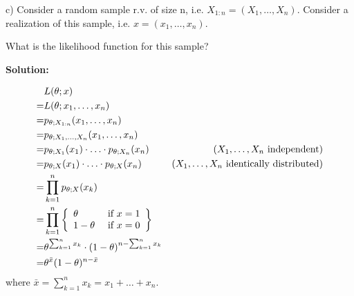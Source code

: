 \documentclass{article}
\begin{document}
c)
Consider a random sample r.v. of size n, i.e. \(X_{1:n}=(X_1, \ldots, X_n)\).
Consider a realization of this sample, i.e. \(x=(x_1, \ldots, x_n)\).

What is the likelihood function for this sample?

\textbf{Solution:}

\begin{align*}
     & L(\theta;x) \\
    =& L(\theta;x_1,\ldots,x_n) \\
    =& p_{\theta;X_{1:n}}(x_1,\ldots,x_n) \\
    =& p_{\theta;X_1,\ldots,X_n}(x_1,\ldots,x_n) \\
    =& p_{\theta;X_1}(x_1)\cdot \ldots \cdot p_{\theta;X_n}(x_n) & (X_1,\ldots,X_n\text{ independent}) \\
    =& p_{\theta;X}(x_1)\cdot \ldots \cdot p_{\theta;X}(x_n) & (X_1,\ldots,X_n\text{ identically distributed}) \\
    =& \prod_{k=1}^n p_{\theta;X}(x_k) \\
    =& \prod_{k=1}^n \left\{\begin{array}{lr}\theta & \text{ if }x=1\\1-\theta & \text{ if }x=0\end{array}\right\} \\
    =& \theta^{\sum_{k=1}^n x_k}\cdot (1-\theta)^{n-\sum_{k=1}^n x_k} \\
    =& \theta^{\bar{x}} (1-\theta)^{n-\bar{x}}
\end{align*}
where \(\bar{x}=\sum_{k=1}^n x_k=x_1+\ldots+x_n\).
\end{document}
